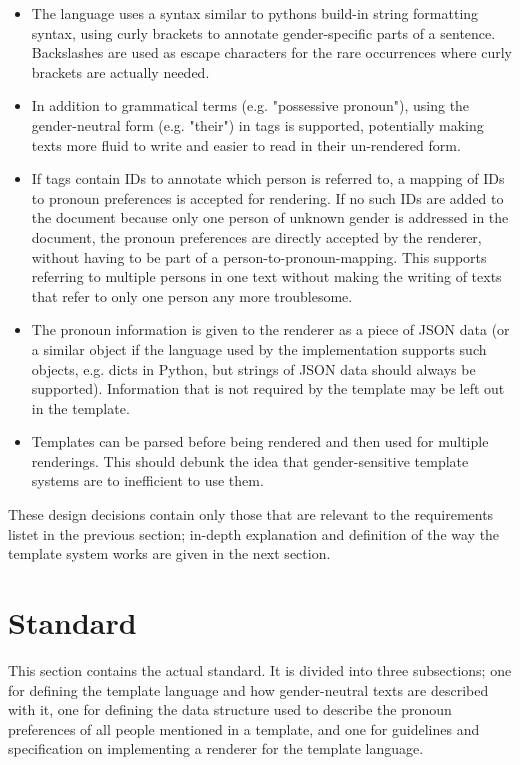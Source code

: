 \documentclass{article}
\begin{document}
    \begin{itemize}
        \item The language uses a syntax similar to pythons build-in string formatting syntax, using curly brackets to annotate gender-specific parts of a sentence.
        Backslashes are used as escape characters for the rare occurrences where curly brackets are actually needed.
        \item In addition to grammatical terms (e.g. "possessive pronoun"), using the gender-neutral form (e.g. "their") in tags is supported, potentially making texts more fluid to write and easier to read in their un-rendered form.
        \item If tags contain IDs to annotate which person is referred to, a mapping of IDs to pronoun preferences is accepted for rendering.
        If no such IDs are added to the document because only one person of unknown gender is addressed in the document, the pronoun preferences are directly accepted by the renderer, without having to be part of a person-to-pronoun-mapping.
        This supports referring to multiple persons in one text without making the writing of texts that refer to only one person any more troublesome.
        \item The pronoun information is given to the renderer as a piece of JSON data (or a similar object if the language used by the implementation supports such objects, e.g. dicts in Python, but strings of JSON data should always be supported).
        Information that is not required by the template may be left out in the template.
        \item Templates can be parsed before being rendered and then used for multiple renderings.
        This should debunk the idea that gender-sensitive template systems are to inefficient to use them.
    \end{itemize}

    These design decisions contain only those that are relevant to the requirements listet in the previous section;
    in-depth explanation and definition of the way the template system works are given in the next section.

\section{Standard}

    This section contains the actual standard.
    It is divided into three subsections;
    one for defining the template language and how gender-neutral texts are described with it,
    one for defining the data structure used to describe the pronoun preferences of all people mentioned in a template,
    and one for guidelines and specification on implementing a renderer for the template language.\\
\end{document}
